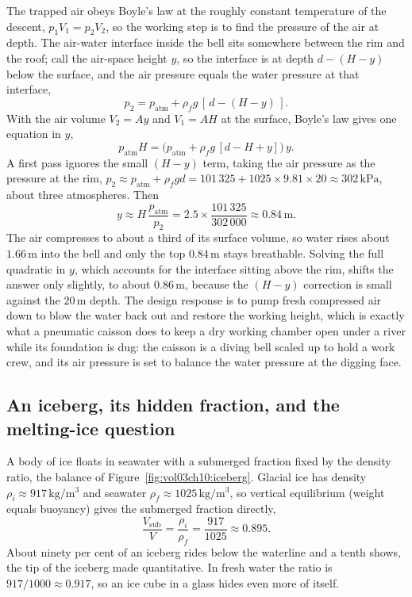 The trapped air obeys Boyle's law at the roughly constant temperature of
the descent, $p_1 V_1 = p_2 V_2$, so the working step is to find the
pressure of the air at depth. The air-water interface inside the bell sits
somewhere between the rim and the roof; call the air-space height $y$, so
the interface is at depth $d - (H - y)$ below the surface, and the air
pressure equals the water pressure at that interface,
\[
p_2 = p_{\text{atm}} + \rho_f g\,[\,d - (H - y)\,].
\]
With the air volume $V_2 = A y$ and $V_1 = A H$ at the surface, Boyle's law
gives one equation in $y$,
\[
p_{\text{atm}} H = \big(p_{\text{atm}} + \rho_f g\,[d - H + y]\big)\,y.
\]
A first pass ignores the small $(H-y)$ term, taking the air pressure as the
pressure at the rim, $p_2 \approx p_{\text{atm}} + \rho_f g d = 101\,325 +
1025 \times 9.81 \times 20 \approx 302\,\text{kPa}$, about three
atmospheres. Then
\[
y \approx H\,\frac{p_{\text{atm}}}{p_2}
= 2.5 \times \frac{101\,325}{302\,000}
\approx 0.84\,\si{\meter}.
\]
The air compresses to about a third of its surface volume, so water rises
about $1.66\,\si{\meter}$ into the bell and only the top $0.84\,\si{\meter}$
stays breathable. Solving the full quadratic in $y$, which accounts for the
interface sitting above the rim, shifts the answer only slightly, to about
$0.86\,\si{\meter}$, because the $(H-y)$ correction is small against the
$20\,\si{\meter}$ depth. The design response is to pump fresh compressed air
down to blow the water back out and restore the working height, which is
exactly what a pneumatic caisson does to keep a dry working chamber open
under a river while its foundation is dug: the caisson is a diving bell
scaled up to hold a work crew, and its air pressure is set to balance the
water pressure at the digging face.



\subsection{An iceberg, its hidden fraction, and the melting-ice question}

A body of ice floats in seawater with a submerged fraction fixed by the
density ratio, the balance of Figure~\ref{fig:vol03ch10:iceberg}. Glacial
ice has density $\rho_i \approx 917\,\si{\kilogram\per\meter\cubed}$ and
seawater $\rho_f \approx 1025\,\si{\kilogram\per\meter\cubed}$, so vertical
equilibrium (weight equals buoyancy) gives the submerged fraction directly,
\[
\frac{V_{\text{sub}}}{V} = \frac{\rho_i}{\rho_f}
= \frac{917}{1025} \approx 0.895.
\]
About ninety per cent of an iceberg rides below the waterline and a tenth
shows, the tip of the iceberg made quantitative. In fresh water the ratio
is $917/1000 \approx 0.917$, so an ice cube in a glass hides even more of
itself.


